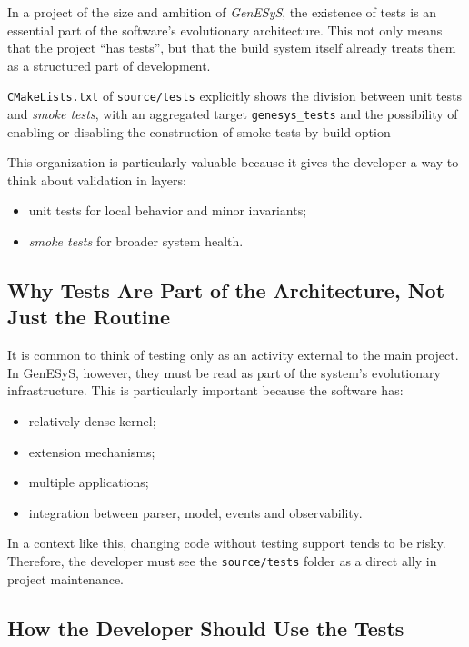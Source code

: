 In a project of the size and ambition of \textit{GenESyS}, the existence of tests is an essential part of the software's evolutionary architecture. This not only means that the project ``has tests'', but that the build system itself already treats them as a structured part of development.

\texttt{CMakeLists.txt} of \texttt{source/tests} explicitly shows the division between unit tests and \textit{smoke tests}, with an aggregated target \texttt{genesys\_tests} and the possibility of enabling or disabling the construction of smoke tests by build option

This organization is particularly valuable because it gives the developer a way to think about validation in layers:
\begin{itemize}
 \item unit tests for local behavior and minor invariants;
 \item \textit{smoke tests} for broader system health.
\end{itemize}

\subsection{Why Tests Are Part of the Architecture, Not Just the Routine}
\label{subsec:cap10_testes_parte_arquitetura}

It is common to think of testing only as an activity external to the main project. In GenESyS, however, they must be read as part of the system's evolutionary infrastructure. This is particularly important because the software has:
\begin{itemize}
 \item relatively dense kernel;
 \item extension mechanisms;
 \item multiple applications;
 \item integration between parser, model, events and observability.
\end{itemize}

In a context like this, changing code without testing support tends to be risky. Therefore, the developer must see the \texttt{source/tests} folder as a direct ally in project maintenance.

\subsection{How the Developer Should Use the Tests}
\label{subsec:cap10_como_usar_testes}

